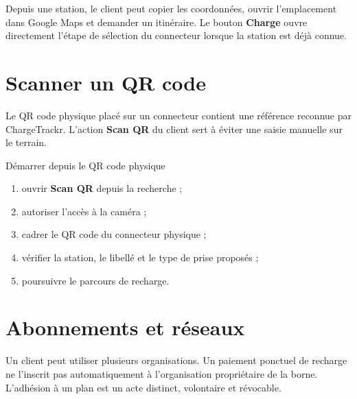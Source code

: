 Depuis une station, le client peut copier les coordonnées, ouvrir l'emplacement
dans Google Maps et demander un itinéraire. Le bouton \textbf{Charge} ouvre
directement l'étape de sélection du connecteur lorsque la station est déjà
connue.


\section{Scanner un QR code}

Le QR code physique placé sur un connecteur contient une référence reconnue par
ChargeTrackr. L'action \textbf{Scan QR} du client sert à éviter une saisie
manuelle sur le terrain.

\begin{procedurebox}{Démarrer depuis le QR code physique}
  \begin{enumerate}[leftmargin=1.6em]
    \item ouvrir \textbf{Scan QR} depuis la recherche ;
    \item autoriser l'accès à la caméra ;
    \item cadrer le QR code du connecteur physique ;
    \item vérifier la station, le libellé et le type de prise proposés ;
    \item poursuivre le parcours de recharge.
  \end{enumerate}
\end{procedurebox}


\section{Abonnements et réseaux}

Un client peut utiliser plusieurs organisations. Un paiement ponctuel de recharge
ne l'inscrit pas automatiquement à l'organisation propriétaire de la borne.
L'adhésion à un plan est un acte distinct, volontaire et révocable.


